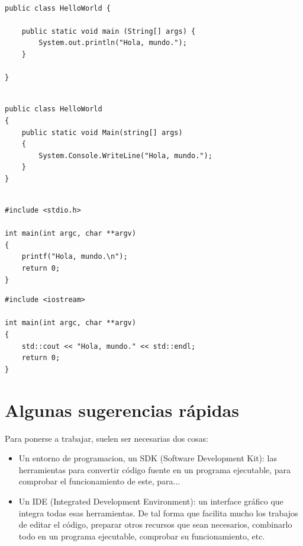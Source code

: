 \documentclass[spanish,12pt,a4paper,final,oneside]{book}
\begin{document}
\begin{lstlisting}[frame=single, caption=lenguaje Java]

public class HelloWorld {
	
    public static void main (String[] args) {
        System.out.println("Hola, mundo.");
    }
	
}

\end{lstlisting}


\begin{lstlisting}[frame=single, caption=lenguaje C\#]

public class HelloWorld
{
    public static void Main(string[] args)
    {
        System.Console.WriteLine("Hola, mundo.");
    }
}
    
\end{lstlisting}


\begin{lstlisting}[frame=single, caption=lenguaje C]
#include <stdio.h>

int main(int argc, char **argv)
{
    printf("Hola, mundo.\n");
    return 0;
}

\end{lstlisting}


\begin{lstlisting}[frame=single, caption=lenguaje C++]
#include <iostream>

int main(int argc, char **argv)
{
	std::cout << "Hola, mundo." << std::endl;
	return 0;
}

\end{lstlisting}

\vspace{2cm}

\section{Algunas sugerencias rápidas}

Para ponerse a trabajar, suelen ser necesarias dos cosas:
\begin{itemize}
\item Un entorno de programacion, un SDK (Software Development Kit): las herramientas para convertir código fuente en un programa ejecutable, para comprobar el funcionamiento de este, para...
\item Un IDE (Integrated Development Environment): un interface gráfico que integra todas esas herramientas. De tal forma que facilita mucho los trabajos de editar el código, preparar otros recursos que sean necesarios, combinarlo todo en un programa ejecutable, comprobar su funcionamiento, etc. 
\end{itemize}
\end{document}
